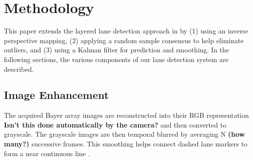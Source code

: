 \documentclass{article}
\begin{document}
\section{Methodology}
\label{sec:methodology}
This paper extends the layered lane detection approach in \cite{borkar_layered_2009} by (1) using an inverse perspective mapping, (2) applying a random sample consensus to help eliminate outliers, and (3) using a Kalman filter for prediction and smoothing.
In the following sections, the various components of our lane detection system are described.
\subsection{Image Enhancement}
The acquired Bayer array images are reconstructed into their RGB representation {\bf Isn't this done automatically by the camera?} and then converted to grayscale. The grayscale images are then temporal blurred by averaging N {\bf (how many?)} successive frames.  This smoothing helps connect dashed lane markers to form a near continuous line \cite{borkar_layered_2009}.
\end{document}
